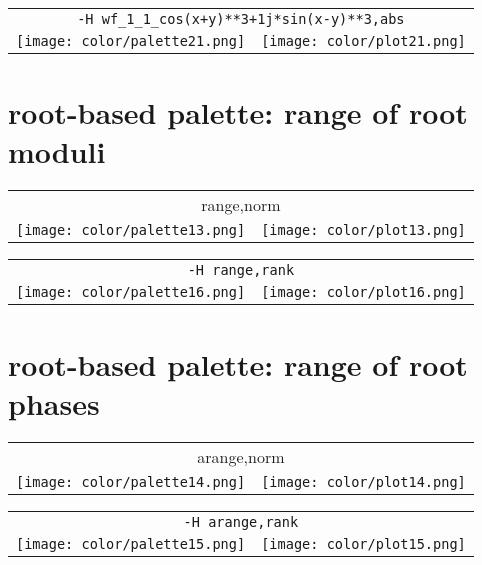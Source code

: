 \documentclass{article}
\begin{document}
\begin{center}
\begin{tabular}{m{8cm}m{8cm}}
\multicolumn{2}{c}{\tt -H wf\_1\_1\_cos(x+y)**3+1j*sin(x-y)**3,abs} \\
\texttt{[image: color/palette21.png]} &
\texttt{[image: color/plot21.png]}
\end{tabular}
\end{center}

\newpage
\section{root-based palette: range of root moduli}
\begin{center}
\begin{tabular}{m{8cm}m{8cm}}
\multicolumn{2}{c}{range,norm} \\
\texttt{[image: color/palette13.png]} &
\texttt{[image: color/plot13.png]}
\end{tabular}
\end{center}

\begin{center}
\begin{tabular}{m{8cm}m{8cm}}
\multicolumn{2}{c}{\tt -H range,rank} \\
\texttt{[image: color/palette16.png]} &
\texttt{[image: color/plot16.png]}
\end{tabular}
\end{center}

\newpage
\section{root-based palette: range of root phases}

\begin{center}
\begin{tabular}{m{8cm}m{8cm}}
\multicolumn{2}{c}{arange,norm} \\
\texttt{[image: color/palette14.png]} &
\texttt{[image: color/plot14.png]}
\end{tabular}
\end{center}

\begin{center}
\begin{tabular}{m{8cm}m{8cm}}
\multicolumn{2}{c}{\tt -H arange,rank} \\
\texttt{[image: color/palette15.png]} &
\texttt{[image: color/plot15.png]}
\end{tabular}
\end{center}
\end{document}
